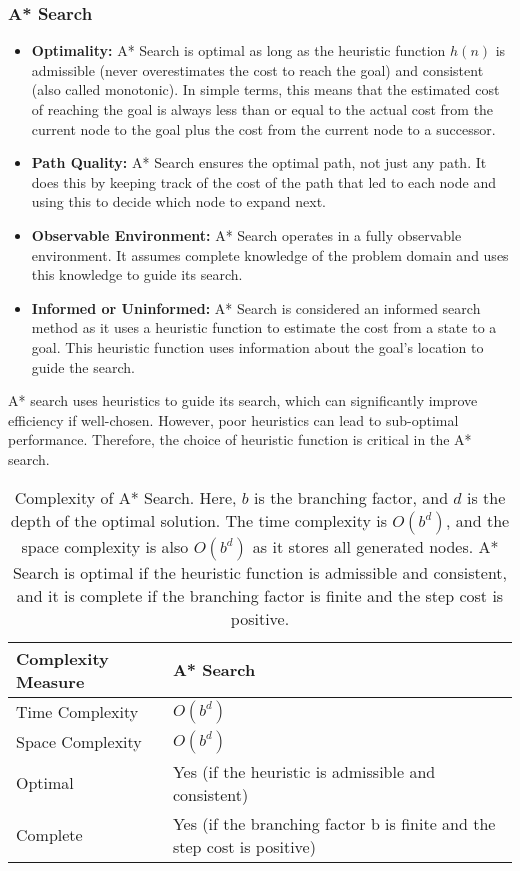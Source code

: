 \documentclass[a4paper,UKenglish,cleveref, autoref, thm-restate]{qlinhta}
\begin{document}
\subsubsection{A* Search}

\begin{itemize}
\item \textbf{Optimality:} A* Search is optimal as long as the heuristic function $h(n)$ is admissible (never overestimates the cost to reach the goal) and consistent (also called monotonic). In simple terms, this means that the estimated cost of reaching the goal is always less than or equal to the actual cost from the current node to the goal plus the cost from the current node to a successor.
\item \textbf{Path Quality:} A* Search ensures the optimal path, not just any path. It does this by keeping track of the cost of the path that led to each node and using this to decide which node to expand next.
\item \textbf{Observable Environment:} A* Search operates in a fully observable environment. It assumes complete knowledge of the problem domain and uses this knowledge to guide its search.
\item \textbf{Informed or Uninformed:} A* Search is considered an informed search method as it uses a heuristic function to estimate the cost from a state to a goal. This heuristic function uses information about the goal's location to guide the search.
\end{itemize}

A* search uses heuristics to guide its search, which can significantly improve efficiency if well-chosen. However, poor heuristics can lead to sub-optimal performance. Therefore, the choice of heuristic function is critical in the A* search.

\begin{table}[H]
\centering
\begin{tabular}{|l|l|}
\hline
\textbf{Complexity Measure} & \textbf{A* Search} \\
\hline
Time Complexity & $O(b^d)$ \\
\hline
Space Complexity & $O(b^d)$ \\
\hline
Optimal & Yes (if the heuristic is admissible and consistent) \\
\hline
Complete & Yes (if the branching factor b is finite and the step cost is positive) \\
\hline
\end{tabular}
\caption{Complexity of A* Search. Here, $b$ is the branching factor, and $d$ is the depth of the optimal solution. The time complexity is $O(b^d)$, and the space complexity is also $O(b^d)$ as it stores all generated nodes. A* Search is optimal if the heuristic function is admissible and consistent, and it is complete if the branching factor is finite and the step cost is positive.}
\label{tab:astar_complexity_detailed}
\end{table}
\end{document}
